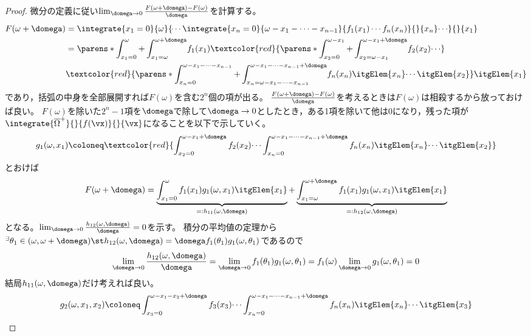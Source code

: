         \begin{proof}
            微分の定義に従い$\lim_{\domega \to 0}\frac{F(\omega+\domega)-F(\omega)}{\domega}$を計算する。
            \begin{align*}
                F(\omega+\domega) &= \integrate{x_1=0}{\omega}{\dotsi\integrate{x_n=0}{\omega-x_1-\dotsb-x_{n-1}}{f_1(x_1)\dotsm f_n(x_n)}{}{x_n}\dotsi}{}{x_1} \\
                &= \parens*{\int_{x_1=0}^\omega+\int_{x_1=\omega}^{\omega+\domega}}f_1(x_1)\textcolor{red}{\parens*{\int_{x_2=0}^{\omega-x_1}+\int_{x_2=\omega-x_1}^{\omega-x_1+\domega}}f_2(x_2)\dotsi}\\
                & \textcolor{red}{\parens*{\int_{x_n=0}^{\omega-x_1-\dotsb-x_{n-1}}+\int_{x_n=\omega-x_1-\dotsb-x_{n-1}}^{\omega-x_1-\dotsb-x_{n-1}+\domega}}f_n(x_n)\itgElem{x_n}\dotsi\itgElem{x_2}}\itgElem{x_1}
            \end{align*}
            であり，括弧の中身を全部展開すれば$F(\omega)$を含む$2^n$個の項が出る。
            $\frac{F(\omega+\domega)-F(\omega)}{\domega}$を考えるときは$F(\omega)$は相殺するから放っておけば良い。
            $F(\omega)$を除いた$2^n-1$項を$\domega$で除して$\domega \to 0$としたとき，ある1項を除いて他は0になり，残った項が$\integrate{\overline{\Omega}^+}{}{f(\vx)}{}{\vx}$になることを以下で示していく。
            \[g_1(\omega,x_1) \coloneq \textcolor{red}{\int_{x_2=0}^{\omega-x_1+\domega}f_2(x_2)\dotsi\int_{x_n=0}^{\omega-x_1-\dotsb-x_{n-1}+\domega}f_n(x_n)\itgElem{x_n}\dotsi\itgElem{x_2}}\]
            とおけば
            \begin{align*}
                F(\omega+\domega) = \underbrace{\int_{x_1=0}^{\omega}f_1(x_1)g_1(\omega,x_1)\itgElem{x_1}}_{=:h_{11}(\omega,\domega)} + \underbrace{\int_{x_1=\omega}^{\omega+\domega}f_1(x_1)g_1(\omega,x_1)\itgElem{x_1}}_{=:h_{12}(\omega,\domega)}
            \end{align*}
            となる。$\lim_{\domega\to 0}\frac{h_{12}(\omega,\domega)}{\domega}=0$を示す。
            積分の平均値の定理から$^\exists\theta_1 \in (\omega,\omega+\domega)\st h_{12}(\omega,\domega)=\domega f_1(\theta_1)g_1(\omega,\theta_1)$であるので
            \[\lim_{\domega\to 0}\frac{h_{12}(\omega,\domega)}{\domega} = \lim_{\domega\to 0}f_1(\theta_1)g_1(\omega,\theta_1) = f_1(\omega)\lim_{\domega\to 0}g_1(\omega,\theta_1) = 0\]
            結局$h_{11}(\omega,\domega)$だけ考えれば良い。
            \[g_2(\omega,x_1,x_2) \coloneq \int_{x_3=0}^{\omega-x_1-x_2+\domega}f_3(x_3)\dotsi\int_{x_n=0}^{\omega-x_1-\dotsb-x_{n-1}+\domega}f_n(x_n)\itgElem{x_n}\dotsi\itgElem{x_3}\]

\end{proof}
